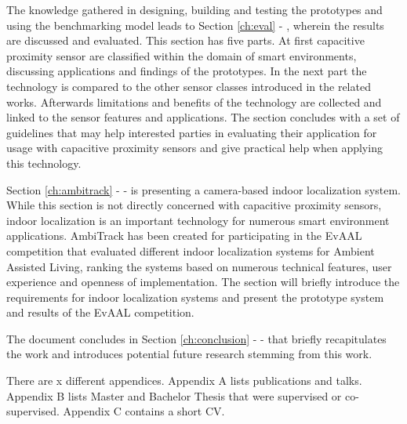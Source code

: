 The knowledge gathered in designing, building and testing the prototypes and using the benchmarking model leads to Section \ref{ch:eval} - \emph{}, wherein the results are discussed and evaluated. This section has five parts. At first capacitive proximity sensor are classified within the domain of smart environments, discussing applications and findings of the prototypes. In the next part the technology is compared to the other sensor classes introduced in the related works. Afterwards limitations and benefits of the technology are collected and linked to the sensor features and applications. The section concludes with a set of guidelines that may help interested parties in evaluating their application for usage with capacitive proximity sensors and give practical help when applying this technology.

Section \ref{ch:ambitrack} - \emph{} - is presenting a camera-based indoor localization system. While this section is not directly concerned with capacitive proximity sensors, indoor localization is an important technology for numerous smart environment applications. AmbiTrack has been created for participating in the EvAAL competition that evaluated different indoor localization systems for Ambient Assisted Living, ranking the systems based on numerous technical features, user experience and openness of implementation. The section will briefly introduce the requirements for indoor localization systems and present the prototype system and results of the EvAAL competition.

The document concludes in Section \ref{ch:conclusion} - \emph{} - that briefly recapitulates the work and introduces potential future research stemming from this work.

There are x different appendices. Appendix A lists publications and talks. Appendix B lists Master and Bachelor Thesis that were supervised or co-supervised. Appendix C contains a short CV.